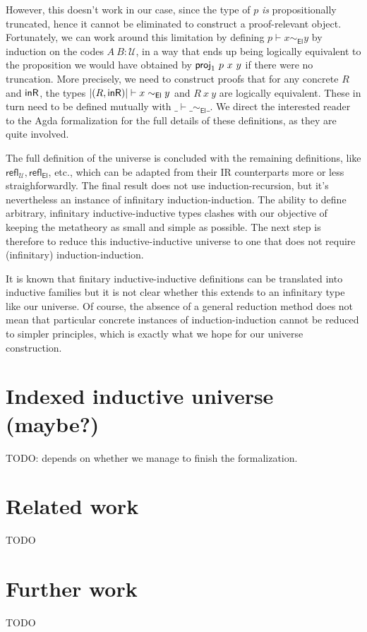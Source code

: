\documentclass{easychair}
\newcommand{\setoidU}{\mathcal{U}}
\newcommand{\ad}[1]{\AgdaFunction{#1}}
\newcommand{\El}{\textsf{El}}
\newcommand{\reflu}{\textsf{refl}_\setoidU}
\newcommand{\reflel}{\textsf{refl}_\El}
\begin{document}
However, this doesn't work in our case, since the type of $p$ \emph{is}
propositionally truncated, hence it cannot be eliminated to construct a
proof-relevant object.
%
Fortunately, we can work around this limitation by defining $p \vdash x
\sim_{\El} y$ by induction on the codes $A\ B : \setoidU$, in a way that ends
up being logically equivalent to the proposition we would have obtained by
$\ad{proj}_1\ p\ x\ y$ if there were no truncation.
%
More precisely, we need to construct proofs that for any concrete $R$ and
$\ad{inR}$, the types $| (R, \ad{inR}) | \vdash x \sim_{\El} y$ and $R\ x\ y$
are logically equivalent. These in turn need to be defined mutually with
$\_\vdash\_\sim_{\El}\_$. We direct the interested reader to the Agda
formalization for the full details of these definitions, as they are quite
involved.

The full definition of the universe is concluded with the remaining definitions,
like $\reflu, \reflel$, etc., which can be adapted from their IR counterparts
more or less straighforwardly. The final result does not use
induction-recursion, but it's nevertheless an instance of infinitary
induction-induction. The ability to define arbitrary, infinitary
inductive-inductive types clashes with our objective of keeping the metatheory
as small and simple as possible. The next step is therefore to reduce this
inductive-inductive universe to one that does not require (infinitary)
induction-induction.

It is known that finitary inductive-inductive definitions can be translated into
inductive families \cite{iit-erasure,iit-to-ix,induction-is-enough} but it is
not clear whether this extends to an infinitary type like our universe.
%
Of course, the absence of a general reduction method does not mean that
particular concrete instances of induction-induction cannot be reduced to
simpler principles, which is exactly what we hope for our universe construction.

\section{Indexed inductive universe (maybe?)}

TODO: depends on whether we manage to finish the formalization.

\section{Related work}

TODO

\section{Further work}

TODO



\end{document}

